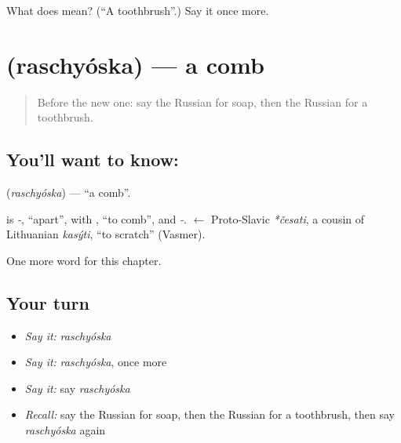 \begin{tcolorbox}[breakable,colback=teal!4,colframe=teal!35!black,title={Before you move on}]
What does   mean? (\textquotedblleft{}A toothbrush\textquotedblright{}.) Say it once more.
\end{tcolorbox}
\section[\texorpdfstring{\ru{расчёска} (raschyóska)}{расчёска (raschyóska)}]{ (raschyóska) — a comb}

\label{lesson:RU-C96-comb}



\begin{quote}
Before the new one: say the Russian for soap, then the Russian for a toothbrush.
\end{quote}

\subsection*{You'll want to know: }
\textbf{} (\emph{raschyóska}) — \textquotedblleft{}a comb\textquotedblright{}.

\begin{cousinweb}
\textbf{} is \emph{-}, \textquotedblleft{}apart\textquotedblright{}, with \emph{}, \textquotedblleft{}to comb\textquotedblright{}, and \emph{-}. \emph{} $\leftarrow$ Proto-Slavic \emph{*česati}, a cousin of Lithuanian \emph{kasýti}, \textquotedblleft{}to scratch\textquotedblright{} (Vasmer).
\end{cousinweb}

\begin{grammarlens}[title={What you've built}]
One more word for this chapter.
\end{grammarlens}

\subsection*{Your turn}
\begin{itemize}
\raggedright
  \item \emph{Say it:} \emph{raschyóska}
  \item \emph{Say it:} \emph{raschyóska}, once more
  \item \emph{Say it:} say \emph{raschyóska}
  \item \emph{Recall:} say the Russian for soap, then the Russian for a toothbrush, then say \emph{raschyóska} again
\end{itemize}

